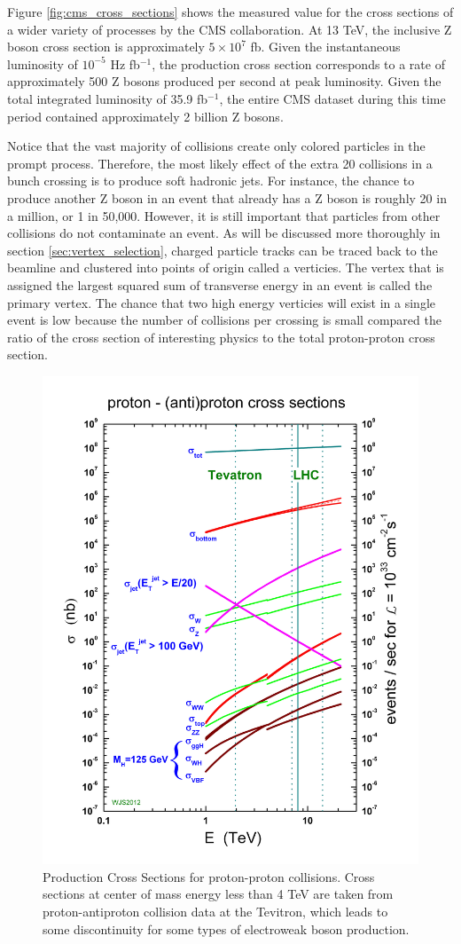    Figure \ref{fig:cms_cross_sections} shows the measured value for the cross sections of a wider variety of processes by the CMS collaboration. At 13 TeV, the inclusive Z boson cross section is approximately $5\times10^{7}$ fb. Given the instantaneous luminosity of $10^{-5}$ Hz fb$^{-1}$, the production cross section corresponds to a rate of approximately 500 Z bosons produced per second at peak luminosity. Given the total integrated luminosity of 35.9 fb$^{-1}$, the entire CMS dataset during this time period contained approximately 2 billion Z bosons.

    Notice that the vast majority of collisions create only colored particles in the prompt process. Therefore, the most likely effect of the extra 20 collisions in a bunch crossing is to produce soft hadronic jets. For instance, the chance to produce another Z boson in an event that already has a Z boson is roughly 20 in a million, or 1 in 50,000. However, it is still important that particles from other collisions do not contaminate an event. As will be discussed more thoroughly in section \ref{sec:vertex_selection}, charged particle tracks can be traced back to the beamline and clustered into points of origin called a verticies. The vertex that is assigned the largest squared sum of transverse energy in an event is called the primary vertex. The chance that two high energy verticies will exist in a single event is low because the number of collisions per crossing is small compared the ratio of the cross section of interesting physics to the total proton-proton cross section.


    \begin{figure}[h!]
      \centering
      \includegraphics[width=.7\textwidth]{figures/lhc_decay_modes.jpg}
      \caption{Production Cross Sections for proton-proton collisions. Cross sections at center of mass energy less than 4 TeV are taken from proton-antiproton collision data at the Tevitron, which leads to some discontinuity for some types of electroweak boson production.}
      \label{fig:lhc_decay_modes}
    \end{figure}

